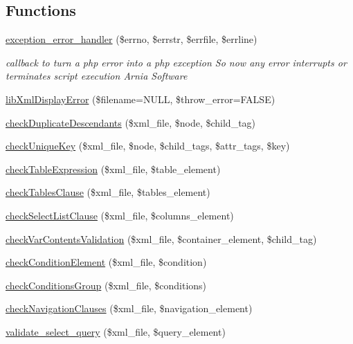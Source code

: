 \subsection*{Functions}
\begin{DoxyCompactItemize}
\item 
\hyperlink{validate_8php_a57d34da3bd80860dfd34620af3c5d246}{exception\+\_\+error\+\_\+handler} (\$errno, \$errstr, \$errfile, \$errline)
\begin{DoxyCompactList}\small\item\em callback to turn a php error into a php exception So now any error interrupts or terminates script execution  Arnia Software \end{DoxyCompactList}\item 
\hyperlink{validate_8php_a314f82b963781ec88823449af5e5134e}{lib\+Xml\+Display\+Error} (\$filename=N\+U\+L\+L, \$throw\+\_\+error=F\+A\+L\+S\+E)
\item 
\hyperlink{validate_8php_afff9c2dd725f410e53f22d5d52c1d18a}{check\+Duplicate\+Descendants} (\$xml\+\_\+file, \$node, \$child\+\_\+tag)
\item 
\hyperlink{validate_8php_a9984e628f1ac1735fbfbacc979b90a37}{check\+Unique\+Key} (\$xml\+\_\+file, \$node, \$child\+\_\+tags, \$attr\+\_\+tags, \$key)
\item 
\hyperlink{validate_8php_abe3fd084273604eb5167f76dab958648}{check\+Table\+Expression} (\$xml\+\_\+file, \$table\+\_\+element)
\item 
\hyperlink{validate_8php_a80f024b0929c10c930a2ea9ca57e6a59}{check\+Tables\+Clause} (\$xml\+\_\+file, \$tables\+\_\+element)
\item 
\hyperlink{validate_8php_a43a94e89907bd4a11d8382f417a79dce}{check\+Select\+List\+Clause} (\$xml\+\_\+file, \$columns\+\_\+element)
\item 
\hyperlink{validate_8php_a0f66aa189f4ff5dc01d93d6735e23ebf}{check\+Var\+Contents\+Validation} (\$xml\+\_\+file, \$container\+\_\+element, \$child\+\_\+tag)
\item 
\hyperlink{validate_8php_a7e99004432e9b496acb353a10401ce23}{check\+Condition\+Element} (\$xml\+\_\+file, \$condition)
\item 
\hyperlink{validate_8php_ac3e33bd5237a5ef47bbedbf962724156}{check\+Conditions\+Group} (\$xml\+\_\+file, \$conditions)
\item 
\hyperlink{validate_8php_a1a7b7327a3c5365b6ccf7828ca909a6f}{check\+Navigation\+Clauses} (\$xml\+\_\+file, \$navigation\+\_\+element)
\item 
\hyperlink{validate_8php_acc6fcea31bae0e5c66af9431bbe89ed3}{validate\+\_\+select\+\_\+query} (\$xml\+\_\+file, \$query\+\_\+element)

\end{DoxyCompactItemize}
